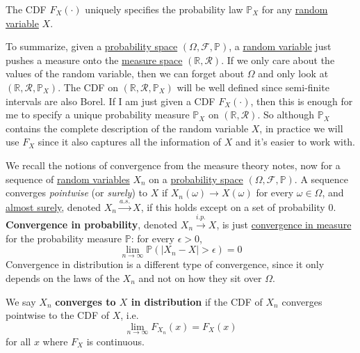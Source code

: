   \begin{theorem}
    \label{thm:the-cdf-determines-the-law}
    The CDF $F_X (\cdot)$ uniquely specifies the probability law $\mathbb{P}_X$ for any \hyperref[def:random-variable]{random variable} $X$. 
  \end{theorem}

  To summarize, given a \hyperref[def:probability-space]{probability space} $(\Omega, \mathcal{F}, \mathbb{P})$, a \hyperref[def:random-variable]{random variable} just pushes a measure onto the \hyperref[mt-def:measure-space]{measure space} $(\mathbb{R}, \mathcal{R})$. If we only care about the values of the random variable, then we can forget about $\Omega$ and only look at $(\mathbb{R}, \mathcal{R}, \mathbb{P}_X)$. The CDF on $(\mathbb{R}, \mathcal{R}, \mathbb{P}_X)$ will be well defined since semi-finite intervals are also Borel. If I am just given a CDF $F_X (\cdot)$, then this is enough for me to specify a unique probability measure $\mathbb{P}_X$ on $(\mathbb{R}, \mathcal{R})$. So although $\mathbb{P}_X$ contains the complete description of the random variable $X$, in practice we will use $F_X$ since it also captures all the information of $X$ and it's easier to work with. 

  We recall the notions of convergence from the measure theory notes, now for a sequence of \hyperref[def:random-variable]{random variables} $X_n$ on a \hyperref[def:probability-space]{probability space} $(\Omega, \mathcal{F}, \mathbb{P})$. A sequence converges \textit{pointwise} (or \textit{surely}) to $X$ if $X_n (\omega) \to X(\omega)$ for every $\omega \in \Omega$, and \hyperref[mt-def:almost-sure-convergence]{almost surely}, denoted $X_n \xrightarrow{a.s.} X$, if this holds except on a set of probability $0$. \textbf{Convergence in probability}, denoted $X_n \xrightarrow{i.p.} X$, is just \hyperref[mt-def:convergence-in-measure]{convergence in measure} for the probability measure $\mathbb{P}$: for every $\epsilon > 0$, 
  \begin{equation}
    \lim_{n \to \infty} \mathbb{P}(|X_n - X| > \epsilon) = 0
  \end{equation}
  Convergence in distribution is a different type of convergence, since it only depends on the laws of the $X_n$ and not on how they sit over $\Omega$. 

  \begin{definition}
    \label{def:convergence-in-distribution}
    We say $X_n$ \textbf{converges to $X$ in distribution} if the CDF of $X_n$ converges pointwise to the CDF of $X$, i.e. 
    \begin{equation}
      \lim_{n \rightarrow \infty} F_{X_n} (x) = F_X (x)
    \end{equation}
    for all $x$ where $F_{X}$ is continuous.
  \end{definition}

